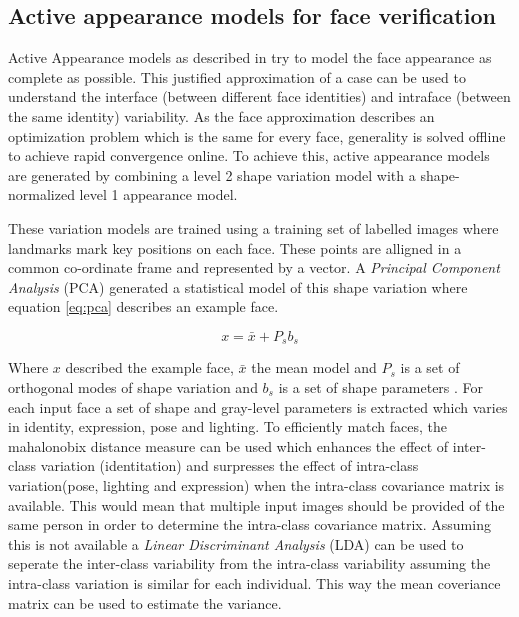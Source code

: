 \documentclass[10pt,a4paper,twocolumn]{article}
\begin{document}
\subsection{Active appearance models for face verification}
\label{sec:aam}

Active Appearance models as described in \cite{edwards1998aam} try to model the face appearance as complete as possible. This justified approximation of a case can be used to understand the interface (between different face identities) and intraface (between the same identity) variability. As the face approximation describes an optimization problem which is the same for every face, generality is solved offline to achieve rapid convergence online. To achieve this, active appearance models are generated by combining a level 2 shape variation model with a shape-normalized level 1 appearance model. 


These variation models are trained using a training set of labelled images where landmarks mark key positions on each face. These points are alligned in a common co-ordinate frame and represented by a vector.  A \emph{Principal Component Analysis} (PCA) generated a statistical model of this shape variation where equation \ref{eq:pca} describes an example face. 

\begin{equation}
 x = \bar{x} + P_s b_s 
\label{eq:pca}
\end{equation}

Where $x$ described the example face, $\bar{x}$ the mean model and $P_s$ is a set of orthogonal modes of shape variation and $b_s$ is a set of shape parameters \cite{edwards1998aam}. For each input face a set of shape and gray-level parameters is extracted which varies in identity, expression, pose and lighting. To efficiently match faces, the mahalonobix distance measure can be used which enhances the effect of inter-class  variation (identitation) and surpresses the effect of intra-class variation(pose, lighting and expression) when the intra-class covariance matrix is available. This would mean that multiple input images should be provided of the same person in order to determine the intra-class covariance matrix. Assuming this is not available a \emph{Linear Discriminant Analysis} (LDA) can be used to seperate the inter-class variability from the intra-class variability assuming the intra-class variation is similar for each individual. This way the mean coveriance matrix can be used to estimate the variance. 
\end{document}
